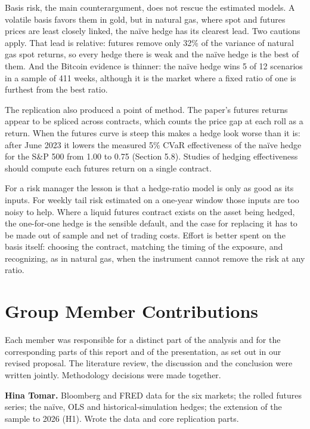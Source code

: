\documentclass[11pt,letterpaper]{article}
\begin{document}
Basis risk, the main counterargument, does not rescue the estimated models. A volatile basis favors them in gold, but in natural gas, where spot and futures prices are least closely linked, the naïve hedge has its clearest lead. Two cautions apply. That lead is relative: futures remove only 32\% of the variance of natural gas spot returns, so every hedge there is weak and the naïve hedge is the best of them. And the Bitcoin evidence is thinner: the naïve hedge wins 5 of 12 scenarios in a sample of 411 weeks, although it is the market where a fixed ratio of one is furthest from the best ratio.

The replication also produced a point of method. The paper's futures returns appear to be spliced across contracts, which counts the price gap at each roll as a return. When the futures curve is steep this makes a hedge look worse than it is: after June 2023 it lowers the measured 5\% CVaR effectiveness of the naïve hedge for the S\&P 500 from 1.00 to 0.75 (Section 5.8). Studies of hedging effectiveness should compute each futures return on a single contract.

For a risk manager the lesson is that a hedge-ratio model is only as good as its inputs. For weekly tail risk estimated on a one-year window those inputs are too noisy to help. Where a liquid futures contract exists on the asset being hedged, the one-for-one hedge is the sensible default, and the case for replacing it has to be made out of sample and net of trading costs. Effort is better spent on the basis itself: choosing the contract, matching the timing of the exposure, and recognizing, as in natural gas, when the instrument cannot remove the risk at any ratio.

\section*{Group Member Contributions}

Each member was responsible for a distinct part of the analysis and for the corresponding parts of this report and of the presentation, as set out in our revised proposal. The literature review, the discussion and the conclusion were written jointly. Methodology decisions were made together.

\textbf{Hina Tomar.} Bloomberg and FRED data for the six markets; the rolled futures series; the naïve, OLS and historical-simulation hedges; the extension of the sample to 2026 (H1). Wrote the data and core replication parts.
\end{document}

